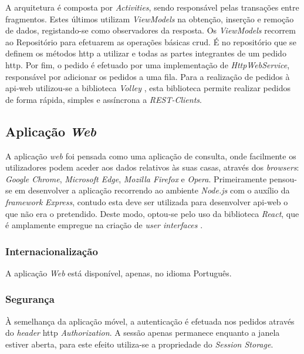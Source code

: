 A arquitetura é composta por \textit{Activities}, sendo responsável pelas transações entre fragmentos. Estes últimos utilizam \textit{ViewModels} na obtenção, inserção e remoção de dados, registando-se como observadores da resposta. Os \textit{ViewModels} recorrem ao Repositório para efetuarem as operações básicas \acrshort{crud}. É no repositório que se definem os métodos \acrshort{http} a utilizar e todas as partes integrantes de um pedido \acrshort{http}. Por fim, o pedido é efetuado por uma implementação de \textit{HttpWebService}, responsável por adicionar os pedidos a uma fila. Para a realização de pedidos à \gls{api-web} utilizou-se a biblioteca \textit{Volley} \cite{Volley:android}, esta biblioteca permite realizar pedidos de forma rápida, simples e assíncrona a \textit{REST-Clients}.




\subsection{Aplicação \textit{Web}}

A aplicação \textit{web} foi pensada como uma aplicação de consulta, onde facilmente os utilizadores podem aceder aos dados relativos às suas casas, através dos \textit{browsers}: \textit{Google Chrome}, \textit{Microsoft Edge}, \textit{Mozilla Firefox} e \textit{Opera}. Primeiramente pensou-se em desenvolver a aplicação recorrendo ao ambiente \textit{Node.js} com o auxílio da \textit{framework} \textit{Express}, contudo esta deve ser utilizada para desenvolver \gls{api-web} o que não era o pretendido. Deste modo, optou-se pelo uso da biblioteca \textit{React}, que é amplamente empregue na criação de \textit{user interfaces} \cite{ReactvsExpress:web}.


\subsubsection{Internacionalização}

A aplicação \textit{Web} está disponível, apenas, no idioma Português.


\subsubsection{Segurança}

À semelhança da aplicação móvel, a autenticação é efetuada nos pedidos através do  \textit{header} \acrshort{http} \textit{Authorization}. A sessão apenas permanece enquanto a janela estiver aberta, para este efeito utiliza-se a propriedade do \textit{Session Storage}.
